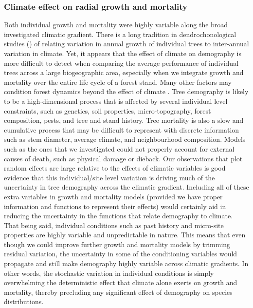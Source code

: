 \subsubsection{Climate effect on radial growth and mortality}
Both individual growth and mortality were highly variable along the broad investigated climatic gradient. There is a long tradition in dendrochonological studies (\eg \citet{Aussenac2017}) of relating variation in annual growth of individual trees to inter-annual variation in climate. Yet, it appears that the effect of climate on demography is more difficult to detect when comparing the average performance of individual trees across a large biogeographic area, especially when we integrate growth and mortality over the entire life cycle of a forest stand. Many other factors may condition forest dynamics beyond the effect of climate \citep{Zhang2015}. Tree demography is likely to be a high-dimensional process \citep{Clark2011} that is affected by several individual level constraints, such as genetics, soil properties, micro-topography, forest composition, pests, and tree and stand history. Tree mortality is also a slow and cumulative process that may be difficult to represent with discrete information such as stem diameter, average climate, and neighbourhood composition. Models such as the ones that we investigated could not properly account for external causes of death, such as physical damage \citep[uprooting, stem breakage, crushing by other falling trees]{Larson2010} or dieback. Our observations that plot random effects are large relative to the effects of climatic variables is good evidence that this individual/site level variation is driving much of the uncertainty in tree demography across the climatic gradient. Including all of these extra variables in growth and mortality models (provided we have proper information and functions to represent their effects) would certainly aid in reducing the uncertainty in the functions that relate demography to climate. That being said, individual conditions such as past history and micro-site properties are highly variable and unpredictable in nature. This means that even though we could improve further growth and mortality models by trimming residual variation, the uncertainty in some of the conditioning variables would propagate and still make demography highly variable across climatic gradients. In other words, the stochastic variation in individual conditions is simply overwhelming the deterministic effect that climate alone exerts on growth and mortality, thereby precluding any significant effect of demography on species distributions.

